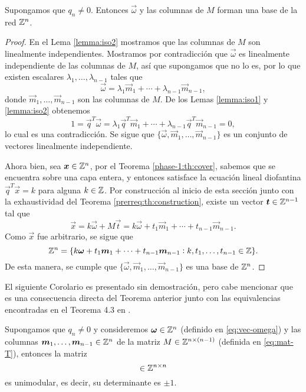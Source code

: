 \begin{theorem}
	\label{th:lattice}
	Supongamos que $q_n \neq 0$. Entonces $\vec{\omega}$ y las columnas de $M$ forman una base
	de la red $\mathbb{Z}^n$.
\end{theorem}
\begin{proof}
	En el Lema \ref{lemma:iso2} mostramos que las columnas de $M$ son linealmente independientes.
	Mostramos por contradicción que $\vec{\omega}$ es linealmente independiente de las columnas de
	$M$, así que supongamos que no lo es, por lo que existen escalares $\lambda_1, \ldots,
	\lambda_{n-1}$ tales que
	\begin{equation*}
		\vec{\omega} = \lambda_1 \vec{m}_1 + \cdots + \lambda_{n-1} \vec{m}_{n-1},
	\end{equation*}
	donde $\vec{m}_1, \ldots, \vec{m}_{n-1}$ son las columnas de $M$. De los Lemas \ref{lemma:iso1}
	y \ref{lemma:iso2} obtenemos
	\begin{equation*}
		1 = \vec{q}^T\vec{\omega} = \lambda_1 \vec{q}^T\vec{m}_1 + \cdots + \lambda_{n-1}
		\vec{q}^T\vec{m}_{n-1} = 0,
	\end{equation*}
	lo cual es una contradicción. Se sigue que $\lbrace \vec{\omega}, \vec{m}_1, \ldots,
	\vec{m}_{n-1}\rbrace$ es un conjunto de vectores linealmente independiente.

	Ahora bien, sea $\boldsymbol{x} \in \mathbb{Z}^n$, por el Teorema \ref{phase-1:th:cover}, sabemos que se
	encuentra sobre una capa entera, y entonces satisface la ecuación lineal diofantina
	$\vec{q}^T\vec{x} = k$ para alguna $k \in \mathbb{Z}$. Por construcción al inicio de esta sección junto
	con la exhaustividad del Teorema \ref{prerreq:th:construction}, existe un vector $\boldsymbol{t} \in
	\mathbb{Z}^{n-1}$ tal que
	\begin{equation*}
		\vec{x} = k\vec{\omega} + M\vec{t} = k\vec{\omega} + t_1\vec{m}_1 + \cdots +
		t_{n-1}\vec{m}_{n-1}.
	\end{equation*}
	Como $\vec{x}$ fue arbitrario, se sigue que
	\begin{equation*}
		\mathbb{Z}^n = \lbrace
		k\boldsymbol{\omega} + t_1\boldsymbol{m}_1 + \cdots + t_{n-1}\boldsymbol{m}_{n-1}
		\vcentcolon k, t_1, \ldots, t_{n-1} \in \mathbb{Z}
		\rbrace.
	\end{equation*}
	De esta manera, se cumple que $\lbrace \vec{\omega}, \vec{m}_1, \ldots, \vec{m}_{n-1}\rbrace$ es
	una base de $\mathbb{Z}^n$.
\end{proof}

El siguiente Corolario es presentado sin demostración, pero cabe mencionar que es una consecuencia
directa del Teorema anterior junto con las equivalencias encontradas en el Teorema 4.3 en \cite{alex}.
\begin{corollary}
	Supongamos que $q_n \neq 0$ y consideremos $\boldsymbol{\omega} \in \mathbb{Z}^n$ (definido en
	\eqref{eq:vec-omega}) y las columnas $\boldsymbol{m}_1, \ldots, \boldsymbol{m}_{n-1} \in \mathbb{Z}^n$ de la matriz $M
	\in \mathbb{Z}^{n \times (n-1)}$ (definida en \eqref{eq:mat-T}), entonces la matriz
	\begin{equation*}
		[ \vec{\omega} \mid \vec{m}_1 \mid \cdots \mid \vec{m}_{n-1} ] \in \Z^{n \times n}
	\end{equation*}
	es unimodular, es decir, su determinante es $\pm 1$.
\end{corollary}

